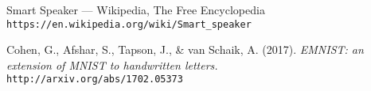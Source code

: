 \renewcommand\bibname{Ашигласан материал}
\begin{thebibliography}{9}
	Smart Speaker --- {W}ikipedia{,} The Free Encyclopedia
	\\\texttt{https://en.wikipedia.org/wiki/Smart\_speaker}

	Cohen, G., Afshar, S., Tapson, J., \& van Schaik, A. (2017). \textit{EMNIST: an extension of MNIST to handwritten letters.}
	\\\texttt{http://arxiv.org/abs/1702.05373}

\end{thebibliography}
